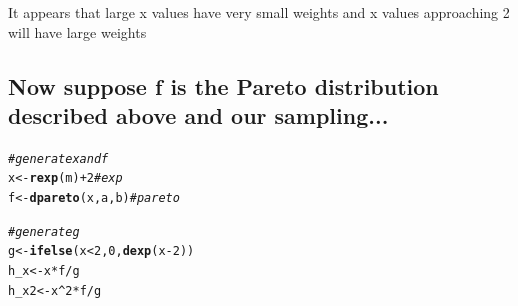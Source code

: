 \documentclass{article}\usepackage[]{graphicx}\usepackage[]{color}
\makeatletter
\newcommand{\hlnum}[1]{\textcolor[rgb]{0.686,0.059,0.569}{#1}}%
\newcommand{\hlcom}[1]{\textcolor[rgb]{0.678,0.584,0.686}{\textit{#1}}}%
\newcommand{\hlopt}[1]{\textcolor[rgb]{0,0,0}{#1}}%
\newcommand{\hlstd}[1]{\textcolor[rgb]{0.345,0.345,0.345}{#1}}%
\newcommand{\hlkwb}[1]{\textcolor[rgb]{0.69,0.353,0.396}{#1}}%
\newcommand{\hlkwd}[1]{\textcolor[rgb]{0.737,0.353,0.396}{\textbf{#1}}}%
\newenvironment{kframe}{%
 \def\at@end@of@kframe{}%
 \ifinner\ifhmode%
  \def\at@end@of@kframe{\end{minipage}}%
  \begin{minipage}{\columnwidth}%
 \fi\fi%
 \def\FrameCommand##1{\hskip\@totalleftmargin \hskip-\fboxsep
 \colorbox{shadecolor}{##1}\hskip-\fboxsep
     \hskip-\linewidth \hskip-\@totalleftmargin \hskip\columnwidth}%
 \MakeFramed {\advance\hsize-\width
   \@totalleftmargin\z@ \linewidth\hsize
   \@setminipage}}%
 {\par\unskip\endMakeFramed%
 \at@end@of@kframe}
\newenvironment{knitrout}{}{} %
\makeatother
\begin{document}
It appears that large x values have very small weights and x values approaching 2 will have large weights
\subsection{Now suppose f is the Pareto distribution described above and our sampling...}

\begin{knitrout}
\color{fgcolor}\begin{kframe}
\begin{alltt}
\hlcom{#generate x and f}
\hlstd{x} \hlkwb{<-} \hlkwd{rexp}\hlstd{(m)}\hlopt{+}\hlnum{2} \hlcom{#exp}
\hlstd{f} \hlkwb{<-} \hlkwd{dpareto}\hlstd{(x, a, b)} \hlcom{#pareto}

\hlcom{#generate g}
\hlstd{g} \hlkwb{<-} \hlkwd{ifelse}\hlstd{(x}\hlopt{<}\hlnum{2}\hlstd{,} \hlnum{0}\hlstd{,} \hlkwd{dexp}\hlstd{(x}\hlopt{-}\hlnum{2}\hlstd{))}
\hlstd{h_x} \hlkwb{<-} \hlstd{x}\hlopt{*}\hlstd{f}\hlopt{/}\hlstd{g}
\hlstd{h_x2} \hlkwb{<-} \hlstd{x}\hlopt{^}\hlnum{2}\hlopt{*}\hlstd{f}\hlopt{/}\hlstd{g}


\end{alltt}
\end{kframe}
\end{knitrout}
\end{document}
